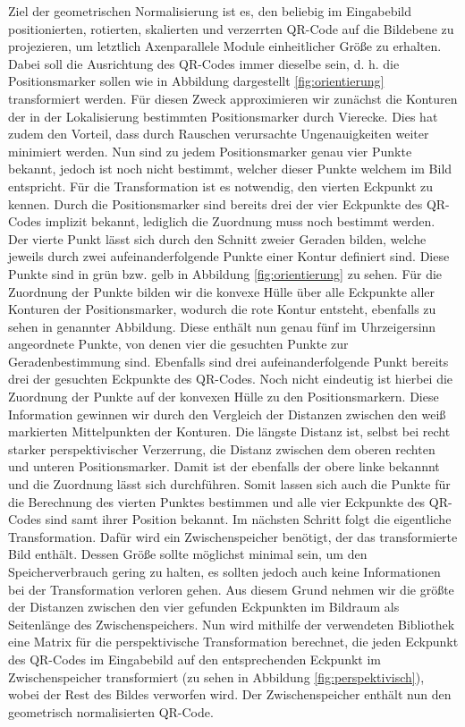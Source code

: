 \documentclass[a4paper, oneside, 12pt]{article}
\begin{document}
Ziel der geometrischen Normalisierung ist es, den beliebig im Eingabebild positionierten, rotierten, skalierten und verzerrten QR-Code auf die Bildebene zu projezieren, um letztlich Axenparallele Module einheitlicher Größe zu erhalten.
Dabei soll die Ausrichtung des QR-Codes immer dieselbe sein, d. h. die Positionsmarker sollen wie in Abbildung dargestellt \ref{fig:orientierung} transformiert werden.
Für diesen Zweck approximieren wir zunächst die Konturen der in der Lokalisierung bestimmten Positionsmarker durch Vierecke. Dies hat zudem den Vorteil, dass durch Rauschen verursachte Ungenauigkeiten weiter minimiert werden. Nun sind zu jedem Positionsmarker genau vier Punkte bekannt, jedoch ist noch nicht bestimmt, welcher dieser Punkte welchem im Bild entspricht. Für die Transformation ist es notwendig, den vierten Eckpunkt zu kennen. Durch die Positionsmarker sind bereits drei der vier Eckpunkte des QR-Codes implizit bekannt, lediglich die Zuordnung muss noch bestimmt werden. Der vierte Punkt lässt sich durch den Schnitt zweier Geraden bilden, welche jeweils durch zwei aufeinanderfolgende Punkte einer Kontur definiert sind. Diese Punkte sind in grün bzw. gelb in Abbildung \ref{fig:orientierung} zu sehen.
Für die Zuordnung der Punkte bilden wir die konvexe Hülle über alle Eckpunkte aller Konturen der Positionsmarker, wodurch die rote Kontur entsteht, ebenfalls zu sehen in genannter Abbildung. Diese enthält nun genau fünf im Uhrzeigersinn angeordnete Punkte, von denen vier die gesuchten Punkte zur Geradenbestimmung sind. Ebenfalls sind drei aufeinanderfolgende Punkt bereits drei der gesuchten Eckpunkte des QR-Codes. Noch nicht eindeutig ist hierbei die Zuordnung der Punkte auf der konvexen Hülle zu den Positionsmarkern. Diese Information gewinnen wir durch den Vergleich der Distanzen zwischen den weiß markierten Mittelpunkten der Konturen. Die längste Distanz ist, selbst bei recht starker perspektivischer Verzerrung, die Distanz zwischen dem oberen rechten und unteren Positionsmarker. Damit ist der ebenfalls der obere linke bekannnt und die Zuordnung lässt sich durchführen. Somit lassen sich auch die Punkte für die Berechnung des vierten Punktes bestimmen und alle vier Eckpunkte des QR-Codes sind samt ihrer Position bekannt.
Im nächsten Schritt folgt die eigentliche Transformation.
Dafür wird ein Zwischenspeicher benötigt, der das transformierte Bild enthält. Dessen Größe sollte möglichst minimal sein, um den Speicherverbrauch gering zu halten, es sollten jedoch auch keine Informationen bei der Transformation verloren gehen. Aus diesem Grund nehmen wir die größte der Distanzen zwischen den vier gefunden Eckpunkten im Bildraum als Seitenlänge des Zwischenspeichers.
Nun wird mithilfe der verwendeten Bibliothek eine Matrix für die perspektivische Transformation berechnet, die jeden Eckpunkt des QR-Codes im Eingabebild auf den entsprechenden Eckpunkt im Zwischenspeicher transformiert (zu sehen in Abbildung \ref{fig:perspektivisch}), wobei der Rest des Bildes verworfen wird.
Der Zwischenspeicher enthält nun den geometrisch normalisierten QR-Code.
\end{document}
